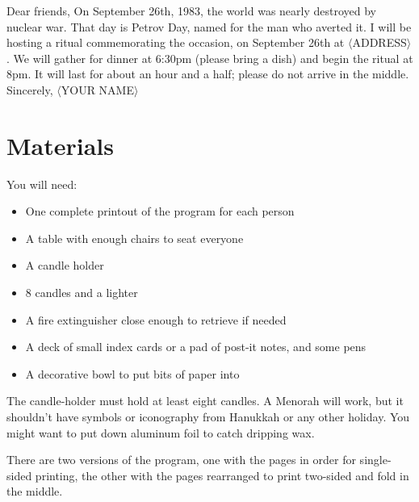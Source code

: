 \documentclass{article}
\begin{document}
\begin{center}
	\parbox{4.5in}{
	Dear friends,\newline
	On September 26th, 1983, the world was nearly destroyed by nuclear war.
	That day is Petrov Day, named for the man who averted it. I will be hosting
	a ritual commemorating the occasion, on September 26th at $\langle$ADDRESS$\rangle$. We
	will gather for dinner at 6:30pm (please bring a dish) and begin the ritual
	at 8pm. It will last for about an hour and a half; please do not arrive in
	the middle.\newline
	Sincerely,\newline
	$\langle$YOUR NAME$\rangle$}
\end{center}

\section{Materials}
You will need:

\begin{itemize} \itemsep0pt \parskip0pt 
	\item One complete printout of the program for each person
	\item A table with enough chairs to seat everyone
	\item A candle holder
	\item 8 candles and a lighter
	\item A fire extinguisher close enough to retrieve if needed
	\item A deck of small index cards or a pad of post-it notes, and some pens
	\item A decorative bowl to put bits of paper into
\end{itemize}

The candle-holder must hold at least eight candles. A Menorah will work, but it
shouldn't have symbols or iconography from Hanukkah or any other holiday. You
might want to put down aluminum foil to catch dripping wax.

There are two versions of the program, one with the pages in order for
single-sided printing, the other with the pages rearranged to print two-sided
and fold in the middle.
\end{document}

